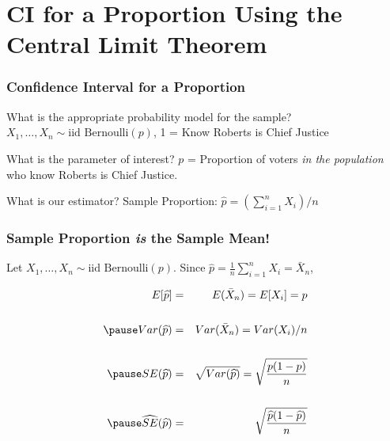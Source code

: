 \section{CI for a Proportion Using the Central Limit Theorem}
\begin{frame}
\frametitle{Confidence Interval for a Proportion}
	\begin{block}{What is the appropriate probability model for the sample?} 
$X_1, \hdots, X_n \sim \mbox{iid Bernoulli}(p)$, 1 = Know Roberts is Chief Justice
\end{block}


	\begin{block}{What is the parameter of interest?}
$p$ = Proportion of voters \emph{in the population} who know Roberts is Chief Justice.
\end{block}



\begin{block}{What is our estimator?} 
Sample Proportion: $\widehat{p} = (\sum_{i=1}^n X_i)/n$
\end{block}
\end{frame}
\begin{frame}
\frametitle{Sample Proportion \emph{is} the Sample Mean!}
Let $X_1, \hdots, X_n \sim \mbox{iid Bernoulli}(p)$. Since $\displaystyle \widehat{p} = \frac{1}{n} \sum_{i=1}^n X_i = \bar{X}_n$,

\pause


	\begin{eqnarray*}
    E[\widehat{p}] &=&  E(\bar{X}_n) = E[X_i] = p \\ \\  \pause
    Var(\widehat{p}) &=&  Var(\bar{X}_n) = Var(X_i)/n \\ \\ \pause
		SE(\widehat{p}) &=&  \sqrt{Var(\widehat{p})} =  \sqrt{\frac{p(1-p)}{n}} \\ \\ \pause
		\widehat{SE}(\widehat{p}) &=&  \sqrt{\frac{\widehat{p}(1-\widehat{p})}{n}}
	\end{eqnarray*}

\end{frame}
